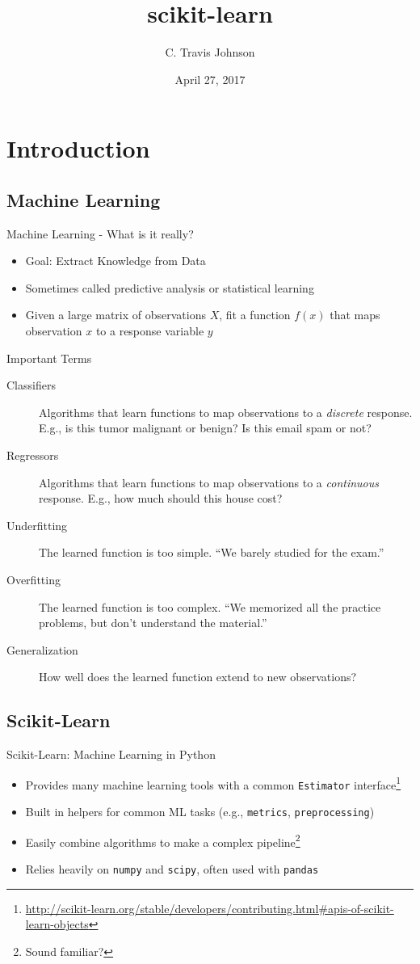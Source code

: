 \documentclass{lug}
\title{scikit-learn}
\author{C. Travis Johnson}
\date{April 27, 2017}
\institute{Mines Linux Users Group}
\begin{document}
\section{Introduction}
\subsection{Machine Learning}
\begin{frame}{Machine Learning - What is it really?}
    \begin{itemize}[<+->]
        \item Goal: Extract Knowledge from Data
        \item Sometimes called predictive analysis or statistical learning
        \item Given a large matrix of observations $X$, fit a function $f(x)$ that maps observation $x$ to a response variable $y$
    \end{itemize}
\end{frame}

\begin{frame}{Important Terms}
  \begin{description}
    \item[Classifiers] Algorithms that learn functions to map observations to a \textit{discrete} response. E.g., is this tumor malignant or benign? Is this
      email spam or not?
    \item[Regressors] Algorithms that learn functions to map observations to a \textit{continuous} response. E.g., how much should this house cost?
    \item[Underfitting] The learned function is too simple. ``We barely studied for the exam.''
    \item[Overfitting] The learned function is too complex. ``We memorized all the practice problems, but don't understand the material.''
    \item[Generalization] How well does the learned function extend to new observations?
  \end{description}
\end{frame}

\subsection{Scikit-Learn}
\begin{frame}{Scikit-Learn: Machine Learning in Python}
  \begin{itemize}[<+->]
    \item Provides many machine learning tools with a common \texttt{Estimator} interface\footnote{
        \url{http://scikit-learn.org/stable/developers/contributing.html\#apis-of-scikit-learn-objects}}
    \item Built in helpers for common ML tasks (e.g., \texttt{metrics}, \texttt{preprocessing})
    \item Easily combine algorithms to make a complex pipeline\footnote{Sound familiar?}
    \item Relies heavily on \texttt{numpy} and \texttt{scipy}, often used with \texttt{pandas}
  \end{itemize}
\end{frame}
\end{document}
